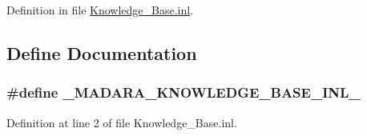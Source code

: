 Definition in file \hyperlink{Knowledge__Base_8inl_source}{Knowledge\_\-Base.inl}.



\subsection{Define Documentation}
\hypertarget{Knowledge__Base_8inl_aa67d29a2394dfbb0bf77b9a52f7ec64b}{
\subsubsection[{\_\-MADARA\_\-KNOWLEDGE\_\-BASE\_\-INL\_\-}]{\setlength{\rightskip}{0pt plus 5cm}\#define \_\-MADARA\_\-KNOWLEDGE\_\-BASE\_\-INL\_\-}}
\label{dd/dfb/Knowledge__Base_8inl_aa67d29a2394dfbb0bf77b9a52f7ec64b}


Definition at line 2 of file Knowledge\_\-Base.inl.

